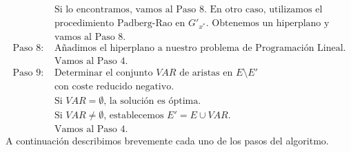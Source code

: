 \documentclass[twoside,a4paper,openright,12pt,tikz]{book}
\begin{document}
\begin{align*}
&\text{Si lo encontramos, vamos al Paso 8. En otro caso, utilizamos el}\\
&\text{procedimiento Padberg-Rao en $G'_{x^*}$. Obtenemos un hiperplano y}\\
&\text{vamos al Paso 8.}\\
\text{Paso 8: }&\text{Añadimos el hiperplano a nuestro problema de Programación Lineal.}\\
&\text{Vamos al Paso 4.}\\
\text{Paso 9: }&\text{Determinar el conjunto $VAR$ de aristas en $E\setminus E'$}\\
&\text{con coste reducido negativo.}\\
&\text{Si $VAR=\emptyset$, la solución es óptima. }\\
&\text{Si $VAR\neq\emptyset$, establecemos $E'=E\cup VAR$.}\\
&\text{Vamos al Paso 4.}
\end{align*}
A continuación describimos brevemente cada uno de los pasos del algoritmo.
\end{document}
